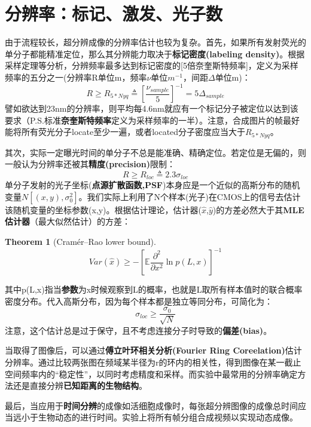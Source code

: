 \documentclass[12pt]{ctexart}%
\newtheorem{theorem}{Theorem}
\begin{document}
\section*{分辨率：标记、激发、光子数}
由于流程较长，超分辨成像的分辨率估计也较为复杂。首先，如果所有发射荧光的单分子都能精准定位，那么其分辨能力取决于\textbf{标记密度(labeling density)}。根据采样定理等分析，分辨频率最多达到标记密度的[5倍奈奎斯特频率]，定义为采样频率的五分之一(分辨率R单位m，频率$\nu$单位$m^{-1}$，间距$\Delta$单位m)：
\begin{equation}
    R\geq R_{5*Nyq}\triangleq[\frac{\nu_{sample}}{5}]^{-1}=5\Delta_{sample}
\end{equation}
譬如欲达到23nm的分辨率，则平均每4.6nm就应有一个标记分子被定位以达到该要求（P.S.标准\textbf{奈奎斯特频率}定义为采样频率的一半）。注意，合成图片的帧最好能将所有荧光分子locate至少一遍，或者located分子密度应当大于$R_{5*Nyq}$。
\par 其次，实际一定曝光时间的单分子不总是能准确、精确定位。若定位是无偏的，则一般认为分辨率还被其\textbf{精度(precision)}限制：
\begin{equation}\label{CRLB}
    R\geq R_{loc}\triangleq2.3\sigma_{loc}
\end{equation}
单分子发射的光子坐标(\textbf{点源扩散函数,PSF})本身应是一个近似的高斯分布的随机变量$N[(x,y),\sigma_0^2]$。我们实际上利用了N个样本(光子)在CMOS上的信号去估计该随机变量的坐标参数(x,y)。根据估计理论，估计器($\hat{x}$,$\hat{y}$)的方差必然大于其\textbf{MLE估计器}（最大似然估计）的方差：
\begin{theorem}[Cramér–Rao lower bound]
    \[Var(\hat{x})\geq-[\mathbb{E}\frac{\partial^2}{\partial x^2}\ln{p(L,x)}]^{-1}\]
\end{theorem}
其中p(L,x)指当\textbf{参数}为x时候观察到L的概率，也就是L取所有样本值时的联合概率密度分布。代入高斯分布，因为每个样本都是独立等同分布，可简化为：
\begin{equation}
    \sigma_{loc}\geq \frac{\sigma_0}{\sqrt{N}}
\end{equation}
注意，这个估计总是过于保守，且不考虑连接分子时导致的\textbf{偏差(bias)}。
\par 当取得了图像后，可以通过\textbf{傅立叶环相关分析(Fourier Ring Coreelation)}估计分辨率。通过比较两张图在频域某半径为r的环内的相关性，得到图像在某一截止空间频率内的“稳定性”，以同时考虑精度和采样。而实验中最常用的分辨率确定方法还是直接分辨\textbf{已知距离的生物结构}。
\par 最后，当应用于\textbf{时间分辨}的成像如活细胞成像时，每张超分辨图像的成像总时间应当远小于生物动态的进行时间。实验上将所有帧分组合成视频以实现动态成像。
\end{document}
